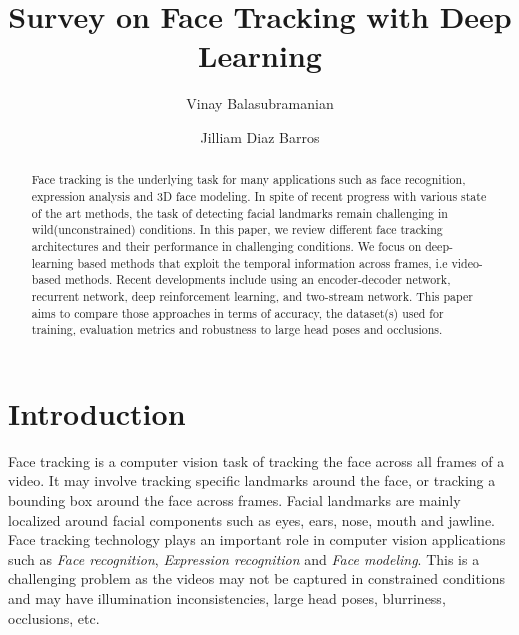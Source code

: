 \documentclass{llncs}
\begin{document}
\pagestyle{headings}  %

%
\title{Survey on Face Tracking with Deep Learning}
%
%
\author{Vinay Balasubramanian \and Jilliam Diaz Barros}
%
%

\maketitle              %

\begin{abstract}
Face tracking is the underlying task for many applications such as face recognition, expression analysis and 3D face modeling. In spite of recent progress with various state of the art methods, the task of detecting facial landmarks remain challenging in wild(unconstrained) conditions. 
In this paper, we review different face tracking architectures and their performance in challenging conditions. We focus on deep-learning based methods that exploit the temporal information across frames, i.e video-based methods. Recent developments include using an encoder-decoder network, recurrent network, deep reinforcement learning, and two-stream network. This paper aims to compare those approaches in terms of accuracy, the dataset(s) used for training, evaluation metrics and robustness to large head poses and occlusions.
\end{abstract}


\section{Introduction}
Face tracking is a computer vision task of tracking the face across all frames of a video. It may involve tracking specific landmarks around the face, or tracking a bounding box around the face across frames. Facial landmarks are mainly localized around facial components such as eyes, ears, nose, mouth and jawline.
Face tracking technology plays an important role in computer vision applications such as \textit{Face recognition}\cite{face_recognition}, \textit{Expression recognition}\cite{expression_recognition} and \textit{Face modeling}\cite{face_modeling}. This is a challenging problem as the videos may not be captured in constrained conditions and may have illumination inconsistencies, large head poses, blurriness, occlusions, etc.
\end{document}
